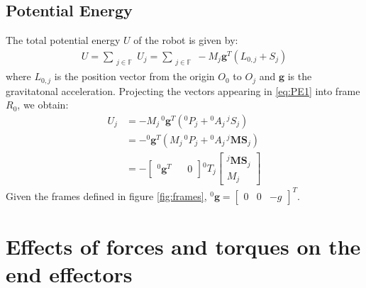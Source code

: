 \documentclass[a4paper,10pt]{article}
\begin{document}
\subsection{Potential Energy}
The total potential energy $U$ of the robot is given by:
\begin{align}
 U = \sum_{\substack{j \in \mathbb{F}}} U_j = \sum_{\substack{j \in \mathbb{F}}} -M_j \mathbf{g}^T(L_{0,j}+S_j) \label{eq:PE1}
\end{align}
where $L_{0,j}$ is the position vector from the origin $O_0$ to $O_j$ and $\mathbf{g}$ is the gravitatonal acceleration. Projecting 
the vectors appearing in \ref{eq:PE1} into frame $R_0$, we obtain:
\begin{align}
 U_j &= -M_j\,{}^0\mathbf{g}^T({}^0P_j+{}^0A_j\,{}^jS_j) \\ &= -{}^0\mathbf{g}^T(M_j\,{}^0P_j+{}^0A_j\,{}^j\mathbf{MS}_j) \\ 
 &= -\left[\begin{matrix} {}^0\mathbf{g}^T && 0 \end{matrix} \right] {}^0T_j\left[ \begin{matrix} {}^j\mathbf{MS}_j \\ M_j \end{matrix} \right]
\end{align}
Given the frames defined in figure \ref{fig:frames}, ${}^0\mathbf{g} = \left[\begin{matrix}0 & 0 & -g \end{matrix}\right]^T$.

\section{Effects of forces and torques on the end effectors}
\end{document}
